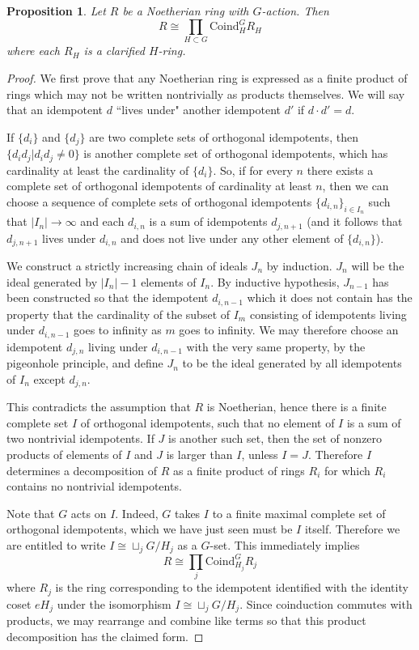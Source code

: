 \documentclass[11pt,dvipsnames]{amsart}
\newtheorem{proposition}[theorem]{Proposition}
\theoremstyle{BoldRemark}
\begin{document}
\begin{proposition}\label{prop:product-splitting-of-G-rings}
	Let $R$ be a Noetherian ring with $G$-action. Then \[ R \cong \prod_{H \subset G} \mathrm{Coind}_H^G R_H \] where each $R_H$ is a clarified $H$-ring.
\end{proposition}

\begin{proof}
	We first prove that any Noetherian ring is expressed as a finite product of rings which may not be written nontrivially as products themselves.	We will say that an idempotent $d$ ``lives under" another idempotent $d'$ if $d \cdot d' = d$.
	
	If $\{ d_i \}$ and $\{ d_j \}$ are two complete sets of orthogonal idempotents, then $\{ d_i d_j | d_i d_j \neq 0 \}$ is another complete set of orthogonal idempotents, which has cardinality at least the cardinality of $\{ d_i \}$. So, if for every $n$ there exists a complete set of orthogonal idempotents of cardinality at least $n$, then we can choose a sequence of complete sets of orthogonal idempotents $\{ d_{i,n} \}_{i \in I_n}$ such that $|I_n| \rightarrow \infty$ and each $d_{i,n}$ is a sum of idempotents $d_{j,n+1}$ (and it follows that $d_{j,n+1}$ lives under $d_{i,n}$ and does not live under any other element of $\{ d_{i,n} \}$).
	
	We construct a strictly increasing chain of ideals $J_n$ by induction. $J_n$ will be the ideal generated by $|I_n|-1$ elements of $I_n$. By inductive hypothesis, $J_{n-1}$ has been constructed so that the idempotent $d_{i,n-1}$ which it does not contain has the property that the cardinality of the subset of $I_m$ consisting of idempotents living under $d_{i,n-1}$ goes to infinity as $m$ goes to infinity. We may therefore choose an idempotent $d_{j,n}$ living under $d_{i,n-1}$ with the very same property, by the pigeonhole principle, and define $J_n$ to be the ideal generated by all idempotents of $I_n$ except $d_{j,n}$.
	
	This contradicts the assumption that $R$ is Noetherian, hence there is a finite complete set $I$ of orthogonal idempotents, such that no element of $I$ is a sum of two nontrivial idempotents. If $J$ is another such set, then the set of nonzero products of elements of $I$ and $J$ is larger than $I$, unless $I = J$. Therefore $I$ determines a decomposition of $R$ as a finite product of rings $R_i$ for which $R_i$ contains no nontrivial idempotents.
	
	Note that $G$ acts on $I$. Indeed, $G$ takes $I$ to a finite maximal complete set of orthogonal idempotents, which we have just seen must be $I$ itself. Therefore we are entitled to write $I \cong \sqcup_j G/H_j$ as a $G$-set. This immediately implies \[ R \cong \prod_j \mathrm{Coind}_{H_j}^G R_j \] where $R_j$ is the ring corresponding to the idempotent identified with the identity coset $eH_j$ under the isomorphism $I \cong \sqcup_j G/H_j$. Since coinduction commutes with products, we may rearrange and combine like terms so that this product decomposition has the claimed form.
\end{proof}
\end{document}

